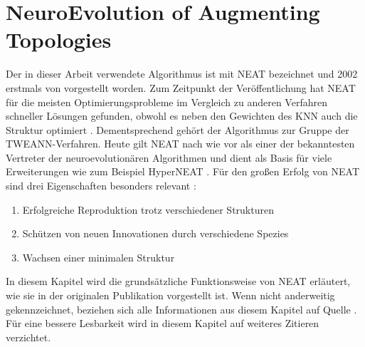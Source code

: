 \section{NeuroEvolution of Augmenting Topologies}
\label{sec:neat}
Der in dieser Arbeit verwendete Algorithmus ist mit \ac{NEAT} bezeichnet und 2002 erstmals von \citeauthor{stanley2002evolving} vorgestellt worden. Zum Zeitpunkt der Veröffentlichung hat \ac{NEAT} für die meisten Optimierungsprobleme im Vergleich zu anderen Verfahren schneller Lösungen gefunden, obwohl es neben den Gewichten des \ac{KNN} auch die Struktur optimiert \cite{stanley2002evolving}. Dementsprechend gehört der Algorithmus zur Gruppe der \ac{TWEANN}-Verfahren. Heute gilt \ac{NEAT} nach wie vor als einer der bekanntesten Vertreter der neuroevolutionären Algorithmen und dient als Basis für viele Erweiterungen wie zum Beispiel HyperNEAT \cite{stanley2009hyperneat}.
Für den großen Erfolg von \ac{NEAT} sind drei Eigenschaften besonders relevant \cite{stanley2002evolving}:
\begin{enumerate}
	\item Erfolgreiche Reproduktion trotz verschiedener Strukturen
	\item Schützen von neuen Innovationen durch verschiedene Spezies
	\item Wachsen einer minimalen Struktur
\end{enumerate}
In diesem Kapitel wird die grundsätzliche Funktionsweise von \ac{NEAT} erläutert, wie sie in der originalen Publikation vorgestellt ist. Wenn nicht anderweitig gekennzeichnet, beziehen sich alle Informationen aus diesem Kapitel auf Quelle \cite{stanley2002evolving}. Für eine bessere Lesbarkeit wird in diesem Kapitel auf weiteres Zitieren verzichtet.
